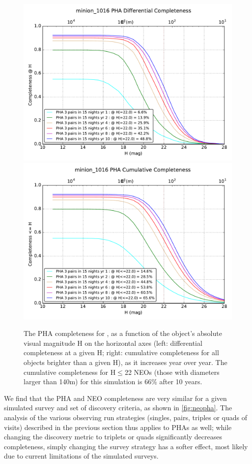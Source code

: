 \begin{figure}[th]
\includegraphics[angle=0,width=0.49\hsize:,clip]{figs/solarsystem/minion_1016_DifferentialCompleteness_PHA_3_pairs_in_15_nights_Years_1_to_10_MOOB_ComboMetricVsH}
\includegraphics[angle=0,width=0.49\hsize:,clip]{figs/solarsystem/minion_1016_CumulativeCompleteness_PHA_3_pairs_in_15_nights_Years_1_to_10_MOOB_ComboMetricVsH}
\caption{The PHA completeness for , as a function of the object's absolute
visual magnitude H on the horizontal axes (left: differential completeness at a given H;
right: cumulative completeness for all objects brighter than a given H), as it increases year over year.
The cumulative completeness for H$\le$22 NEOs (those with diameters larger than 140m)  for this
simulation is 66\% after 10 years.}
\label{fig:baselinePHA}
\end{figure}

We find that the PHA and NEO completeness are very similar for a given simulated survey and set of discovery criteria, as shown in \autoref{fig:neopha}.  The analysis of the various observing run strategies (singles, pairs, triples or quads of visits) described in the previous section thus applies to PHAs as well; while changing the discovery metric to triplets or quads significantly decreases completeness, simply changing the survey strategy has a softer effect, most likely due to current limitations of the simulated surveys.

